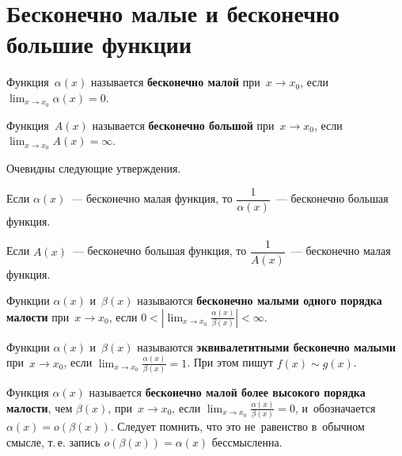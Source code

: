 \section{Бесконечно малые и бесконечно большие функции}
\hypertarget{def:infinitely_small_function}{} Функция~$\alpha(x)$ называется \textbf{бесконечно малой} при~$x \to x_0$, если $\displaystyle \lim_{x \to x_0} \alpha(x) = 0$.

\hypertarget{def:infinitely_large_function}{} Функция~$A(x)$ называется \textbf{бесконечно большой} при~$x \to x_0$, если $\displaystyle \lim_{x \to x_0} A(x) = \infty$.

Очевидны следующие утверждения.
\begin{statement}
Если $\alpha(x)$~--- бесконечно малая функция, то $\dfrac1{\alpha(x)}$~--- бесконечно большая функция.
\end{statement}

\begin{statement}
Если $A(x)$~--- бесконечно большая функция, то $\dfrac1{A(x)}$~--- бесконечно малая функция.
\end{statement}

Функции $\alpha(x)$ и~$\beta(x)$ называются \textbf{бесконечно малыми одного порядка малости} при~$x \to x_0$, если $\displaystyle 0 < \left| \lim_{x \to x_0} \frac{\alpha(x)}{\beta(x)} \right| < \infty$.

Функции $\alpha(x)$ и~$\beta(x)$ называются \textbf{эквивалетнтными бесконечно малыми} при~$x \to x_0$, если $\displaystyle \lim_{x \to x_0} \frac{\alpha(x)}{\beta(x)} = 1$.
При этом пишут $f(x) \sim g(x)$.

Функция $\alpha(x)$ называется \textbf{бесконечно малой более высокого порядка малости}, чем $\beta(x)$, при~$x \to x_0$, если $\displaystyle \lim_{x \to x_0} \frac{\alpha(x)}{\beta(x)} = 0$, и~обозначается $\alpha(x) = o(\beta(x))$.
Следует помнить, что это не~равенство в~обычном смысле, т.\,е. запись $o(\beta(x)) = \alpha(x)$ бессмысленна.